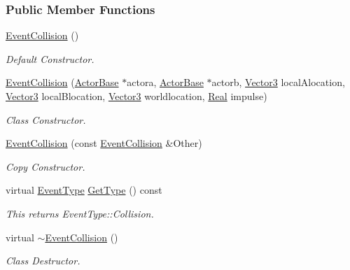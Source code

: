 \subsubsection*{Public Member Functions}
\begin{DoxyCompactItemize}
\item 
\hypertarget{classphys_1_1EventCollision_af44ef170326f56879e9e4608984a4196}{
\hyperlink{classphys_1_1EventCollision_af44ef170326f56879e9e4608984a4196}{EventCollision} ()}
\label{classphys_1_1EventCollision_af44ef170326f56879e9e4608984a4196}

\begin{DoxyCompactList}\small\item\em Default Constructor. \item\end{DoxyCompactList}\item 
\hyperlink{classphys_1_1EventCollision_a0f5a0862cde3b7db4482be6984434742}{EventCollision} (\hyperlink{classphys_1_1ActorBase}{ActorBase} $\ast$actora, \hyperlink{classphys_1_1ActorBase}{ActorBase} $\ast$actorb, \hyperlink{classphys_1_1Vector3}{Vector3} localAlocation, \hyperlink{classphys_1_1Vector3}{Vector3} localBlocation, \hyperlink{classphys_1_1Vector3}{Vector3} worldlocation, \hyperlink{namespacephys_af7eb897198d265b8e868f45240230d5f}{Real} impulse)
\begin{DoxyCompactList}\small\item\em Class Constructor. \item\end{DoxyCompactList}\item 
\hyperlink{classphys_1_1EventCollision_a85c999154866380d232ddcdfd9534c85}{EventCollision} (const \hyperlink{classphys_1_1EventCollision}{EventCollision} \&Other)
\begin{DoxyCompactList}\small\item\em Copy Constructor. \item\end{DoxyCompactList}\item 
virtual \hyperlink{classphys_1_1EventBase_a5e6a8564e127f654123f0bf6a2751923}{EventType} \hyperlink{classphys_1_1EventCollision_a96c2809f1bbab78b9f2758cea15a9a36}{GetType} () const 
\begin{DoxyCompactList}\small\item\em This returns EventType::Collision. \item\end{DoxyCompactList}\item 
virtual \hyperlink{classphys_1_1EventCollision_afcbf057fc955ce6c05b21c08325b1822}{$\sim$EventCollision} ()
\begin{DoxyCompactList}\small\item\em Class Destructor. \item\end{DoxyCompactList}\end{DoxyCompactItemize}
